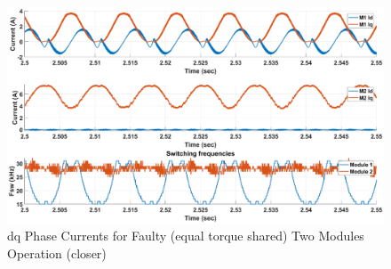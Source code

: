 \documentclass{article}
\begin{document}
\begin{figure}[h!]
\centering
\includegraphics[scale=0.35]{SimulationResults/two_modules/faulty_torqueshared/Idq_iqripple_fsw_close.eps}
\caption{dq Phase Currents for Faulty (equal torque shared) Two Modules Operation (closer)}
\label{fig:PhaseCurrentsDqTwoModulesFaultyEqualTorqueClose}
\end{figure}



\end{document}
